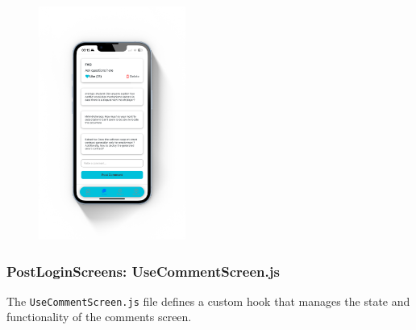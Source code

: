 \begin{figure}[!ht]
    \centering
    \includegraphics[width=0.43\textwidth]
    {LATEX/Appendices/Images/Software/Frontend/comment_screen.png}
    \label{fig:comment screen}
\end{figure}

\subsubsection{PostLoginScreens: UseCommentScreen.js}

The \texttt{UseCommentScreen.js} file defines a custom hook that manages the state and functionality of the comments screen.

